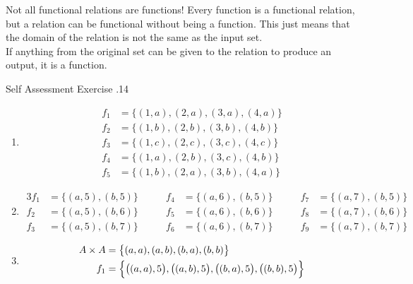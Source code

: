 \documentclass[../notes.tex]{subfiles}
\begin{document}
				\begin{sidenote}{Not all functional relations are functions!}
					Every function is a functional relation, but a relation can be functional without being a function. This just means that the domain of the relation is not the same as the input set.\\
					If anything from the original set can be given to the relation to produce an output, it is a function.
				\end{sidenote}
				\begin{exercise}{Self Assessment Exercise \thechapter.14}
					\begin{enumerate}
						\item {}
							\begin{align*}
								f_{1} &= \bigl\{(1, a), (2, a), (3, a), (4, a)\bigr\}\\
								f_{2} &= \bigl\{(1, b), (2, b), (3, b), (4, b)\bigr\}\\
								f_{3} &= \bigl\{(1, c), (2, c), (3, c), (4, c)\bigr\}\\
								f_{4} &= \bigl\{(1, a), (2, b), (3, c), (4, b)\bigr\}\\
								f_{5} &= \bigl\{(1, b), (2, a), (3, b), (4, a)\bigr\}
							\end{align*}
						\item {}
							\begin{alignat*}{3}
								f_{1} &= \bigl\{(a, 5), (b, 5)\bigr\} \qquad & f_{4} &= \bigl\{(a, 6), (b, 5)\bigr\} \qquad & f_{7} &= \bigl\{(a, 7), (b, 5)\bigr\}\\
								f_{2} &= \bigl\{(a, 5), (b, 6)\bigr\} \qquad & f_{5} &= \bigl\{(a, 6), (b, 6)\bigr\} \qquad & f_{8} &= \bigl\{(a, 7), (b, 6)\bigr\}\\
								f_{3} &= \bigl\{(a, 5), (b, 7)\bigr\} \qquad & f_{6} &= \bigl\{(a, 6), (b, 7)\bigr\} \qquad & f_{9} &= \bigl\{(a, 7), (b, 7)\bigr\}
							\end{alignat*}
						\item {}
							\begin{align*}
								A \times A &= \bigl\{(a, a), (a, b), (b, a), (b, b)\bigr\}\\
								f_{1} &= \Bigl\{\bigl((a, a), 5\bigr), \bigl((a, b), 5\bigr), \bigl((b, a), 5\bigr), \bigl((b, b), 5\bigr)\Bigr\}\\

\end{align*}
\end{enumerate}
\end{exercise}
\end{document}
